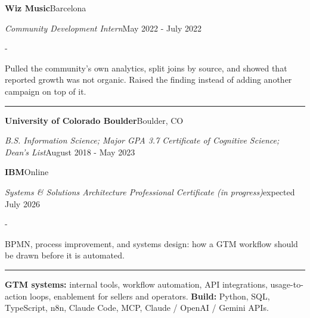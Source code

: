 \documentclass[10pt,letterpaper]{article}
\newenvironment{cvitems}{%
  \begin{list}{-}{%
    \setlength{\leftmargin}{12pt}%
    \setlength{\itemsep}{1.2pt}%
    \setlength{\parsep}{0pt}%
    \setlength{\topsep}{1.5pt}%
    \setlength{\partopsep}{0pt}%
    \setlength{\labelwidth}{6pt}%
    \setlength{\labelsep}{6pt}%
    \setlength{\itemindent}{0pt}%
  }%
}{\end{list}}
\newcommand{\cvsection}[1]{%
  \vspace{7pt}%
  \noindent{\bfseries\fontsize{11pt}{13pt}\selectfont\MakeUppercase{#1}}\par
  \vspace{1pt}%
  \noindent\rule{\textwidth}{0.4pt}\par
  \vspace{4pt}%
}
\newcommand{\cventryhead}[4]{%
  \noindent\textbf{#1}\hfill#2\par
  \vspace{0.5pt}%
  \noindent\textit{#3}\hfill#4\par
}
\newcommand{\cveduhead}[4]{%
  \noindent\textbf{#1}\hfill#2\par
  \vspace{0.5pt}%
  \noindent\textit{#3}\hfill#4\par
}
\begin{document}
\vspace{3pt}
\cventryhead{Wiz Music}{Barcelona}
{Community Development Intern}{May 2022 - July 2022}
\begin{cvitems}
  \item Pulled the community's own analytics, split joins by source, and showed that reported growth was not organic. Raised the finding instead of adding another campaign on top of it.
\end{cvitems}

\cvsection{Education}

\cveduhead{University of Colorado Boulder}{Boulder, CO}
{B.S. Information Science; Major GPA 3.7 \textbar{} Certificate of Cognitive Science; Dean's List}{August 2018 - May 2023}

\vspace{3pt}
\cveduhead{IBM}{Online}
{Systems \& Solutions Architecture Professional Certificate (in progress)}{expected July 2026}
\begin{cvitems}
  \item BPMN, process improvement, and systems design: how a GTM workflow should be drawn before it is automated.
\end{cvitems}

\cvsection{Skills}

{\raggedright
\noindent\textbf{GTM systems:} internal tools, workflow automation, API integrations, usage-to-action loops, enablement for sellers and operators. \textbf{Build:} Python, SQL, TypeScript, n8n, Claude Code, MCP, Claude / OpenAI / Gemini APIs.\par
}
\end{document}
